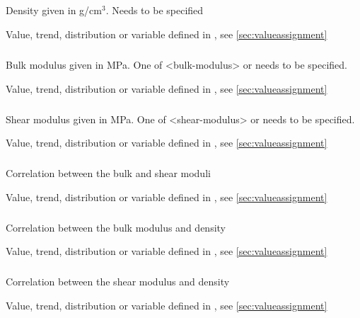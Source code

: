 {\subparagraph{}
 \slist
   \item \Description Density given in g/cm$^3$. Needs to be specified
   \item \Argument Value, trend, distribution or variable defined in , see \autoref{sec:valueassignment}
   \item \Default 
 \elist

\subparagraph{}
 \slist
   \item \Description Bulk modulus given in MPa. One of <bulk-modulus> or  needs to be specified.
   \item \Argument Value, trend, distribution or variable defined in , see \autoref{sec:valueassignment}
   \item \Default 
 \elist

\subparagraph{}
 \slist
   \item \Description Shear modulus given in MPa. One of <shear-modulus> or  needs to be specified.
   \item \Argument Value, trend, distribution or variable defined in , see \autoref{sec:valueassignment}
   \item \Default 
 \elist

\subparagraph{}
 \slist
   \item \Description Correlation between the bulk and shear moduli
   \item \Argument Value, trend, distribution or variable defined in , see \autoref{sec:valueassignment}
   \item {}
 \elist

\subparagraph{}
 \slist
   \item \Description Correlation between the bulk modulus and density
   \item \Argument Value, trend, distribution or variable defined in , see \autoref{sec:valueassignment}
   \item {}
 \elist

\subparagraph{}
 \slist
   \item \Description Correlation between the shear modulus and density
   \item \Argument Value, trend, distribution or variable defined in , see \autoref{sec:valueassignment}
   \item {}
 \elist

}
